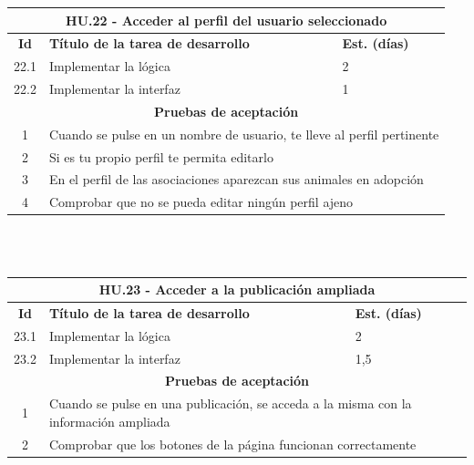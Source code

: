 \begin{tabular}{|c|p{9.5cm}|p{1cm}|}
	\hline
	\multicolumn{3}{|c|}{\textbf{HU.22 - Acceder al perfil del usuario seleccionado}} \\
	\hline
	\textbf{Id} & \textbf{Título de la tarea de desarrollo} & \textbf{Est. (días)} \\
	\hline
	22.1 &  Implementar la lógica & 2 \\ \hline
	22.2 &  Implementar la interfaz & 1 \\ \hline
	\multicolumn{3}{|c|}{\textbf{Pruebas de aceptación}} \\ \hline
	1 & \multicolumn{2}{|p{12cm}|}{Cuando se pulse en un nombre de usuario, te lleve al perfil pertinente} \\ \hline
	2 & \multicolumn{2}{|p{12cm}|}{Si es tu propio perfil te permita editarlo} \\ \hline
	3 & \multicolumn{2}{|p{12cm}|}{En el perfil de las asociaciones aparezcan sus animales en adopción} \\ \hline
	4 & \multicolumn{2}{|p{12cm}|}{Comprobar que no se pueda editar ningún perfil ajeno} \\ \hline
	
\end{tabular} \\ \\

\begin{tabular}{|c|p{9.5cm}|p{1cm}|}
	\hline
	\multicolumn{3}{|c|}{\textbf{HU.23 - Acceder a la publicación ampliada}} \\
	\hline
	\textbf{Id} & \textbf{Título de la tarea de desarrollo} & \textbf{Est. (días)} \\
	\hline
	23.1 &  Implementar la lógica & 2 \\ \hline
	23.2 &  Implementar la interfaz & 1,5 \\ \hline
	\multicolumn{3}{|c|}{\textbf{Pruebas de aceptación}} \\ \hline
	1 & \multicolumn{2}{|p{12cm}|}{Cuando se pulse en una publicación, se acceda a la misma con la información ampliada} \\ \hline
	2 & \multicolumn{2}{|p{12cm}|}{Comprobar que los botones de la página funcionan correctamente} \\ \hline
	
\end{tabular} \\ \\


